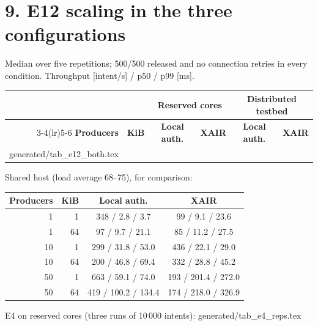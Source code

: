 \documentclass[11pt]{article}
\makeatletter
\newcommand{\gen}[1]{\@@input generated/#1.tex }
\makeatother
\begin{document}
\section*{9. E12 scaling in the three configurations}
Median over five repetitions; 500/500 released and no connection retries in every condition. Throughput [intent/s] / p50 / p99 [ms].
\begin{center}\small
\begin{tabular}{@{}rrcccc@{}}
\toprule
& & \multicolumn{2}{c}{\textbf{Reserved cores}} & \multicolumn{2}{c}{\textbf{Distributed testbed}} \\
\cmidrule(lr){3-4}\cmidrule(lr){5-6}
\textbf{Producers} & \textbf{KiB} & \textbf{Local auth.} & \textbf{XAIR} & \textbf{Local auth.} & \textbf{XAIR} \\
\midrule
\gen{tab_e12_both}
\bottomrule
\end{tabular}
\end{center}
Shared host (load average 68--75), for comparison:
\begin{center}\small
\begin{tabular}{@{}rrcc@{}}
\toprule
\textbf{Producers} & \textbf{KiB} & \textbf{Local auth.} & \textbf{XAIR} \\
\midrule
1  & 1  & 348 / 2.8 / 3.7     & 99 / 9.1 / 23.6 \\
1  & 64 & 97 / 9.7 / 21.1     & 85 / 11.2 / 27.5 \\
10 & 1  & 299 / 31.8 / 53.0   & 436 / 22.1 / 29.0 \\
10 & 64 & 200 / 46.8 / 69.4   & 332 / 28.8 / 45.2 \\
50 & 1  & 663 / 59.1 / 74.0   & 193 / 201.4 / 272.0 \\
50 & 64 & 419 / 100.2 / 134.4 & 174 / 218.0 / 326.9 \\
\bottomrule
\end{tabular}
\end{center}
E4 on reserved cores (three runs of 10\,000 intents): \gen{tab_e4_reps}
\end{document}
